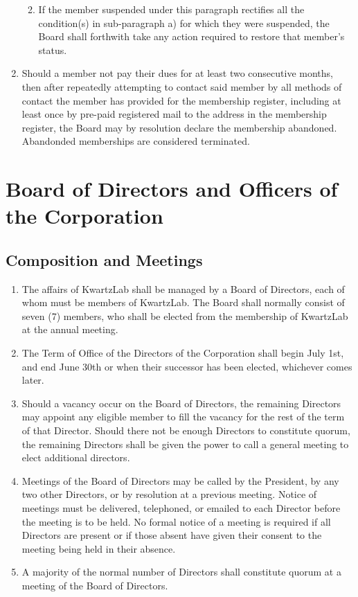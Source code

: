 \documentclass{article}
\begin{document}
\begin{enumerate}
\begin{enumerate}
\begin{enumerate}
		\end{enumerate}
	\item If the member suspended under this paragraph rectifies all the condition(s) in sub-paragraph a) for which they were suspended, the Board shall forthwith take any action required to restore that member's status.
	\end{enumerate}
\item Should a member not pay their dues for at least two consecutive months, then after repeatedly attempting to contact said member by all methods of contact the member has provided for the membership register, including at least once by pre-paid registered mail to the address in the membership register, the Board may by resolution declare the membership abandoned. Abandonded memberships are considered terminated.
\end{enumerate}

\section{Board of Directors and Officers of the Corporation}

\subsection{Composition and Meetings}

\begin{enumerate}
\item The affairs of KwartzLab shall be managed by a Board of Directors, each of whom must be members of KwartzLab. The Board shall normally consist of seven (7) members, who shall be elected from the membership of KwartzLab at the annual meeting.
\item The Term of Office of the Directors of the Corporation shall begin July 1st, and end June 30th or when their successor has been elected, whichever comes later.
\item Should a vacancy occur on the Board of Directors, the remaining Directors may appoint any eligible member to fill the vacancy for the rest of the term of that Director. Should there not be enough Directors to constitute quorum, the remaining Directors shall be given the power to call a general meeting to elect additional directors.
\item Meetings of the Board of Directors may be called by the President, by any two other Directors, or by resolution at a previous meeting. Notice of meetings must be delivered, telephoned, or emailed to each Director before the meeting is to be held. No formal notice of a meeting is required if all Directors are present or if those absent have given their consent to the meeting being held in their absence.
\item A majority of the normal number of Directors shall constitute quorum at a meeting of the Board of Directors.
\end{enumerate}
\end{document}
